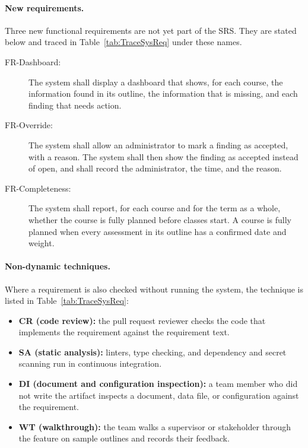 \documentclass[12pt, titlepage]{article}
\begin{document}
\paragraph{New requirements.}
Three new functional requirements are not yet part of the SRS. They are stated
below and traced in Table~\ref{tab:TraceSysReq} under these names.
\begin{description}
  \item[FR-Dashboard:] The system shall display a dashboard that shows, for each
  course, the information found in its outline, the information that is
  missing, and each finding that needs action.
  \item[FR-Override:] The system shall allow an administrator to mark a finding
  as accepted, with a reason. The system shall then show the finding as
  accepted instead of open, and shall record the administrator, the time, and
  the reason.
  \item[FR-Completeness:] The system shall report, for each course and for the
  term as a whole, whether the course is fully planned before classes start.
  A course is fully planned when every assessment in its outline has a
  confirmed date and weight.
\end{description}

\paragraph{Non-dynamic techniques.}
Where a requirement is also checked without running the system, the
technique is listed in Table~\ref{tab:TraceSysReq}:
\begin{itemize}
  \item \textbf{CR (code review):} the pull request reviewer checks the code
  that implements the requirement against the requirement text.
  \item \textbf{SA (static analysis):} linters, type checking, and dependency
  and secret scanning run in continuous integration.
  \item \textbf{DI (document and configuration inspection):} a team member who
  did not write the artifact inspects a document, data file, or configuration
  against the requirement.
  \item \textbf{WT (walkthrough):} the team walks a supervisor or stakeholder
  through the feature on sample outlines and records their feedback.
\end{itemize}
\end{document}
